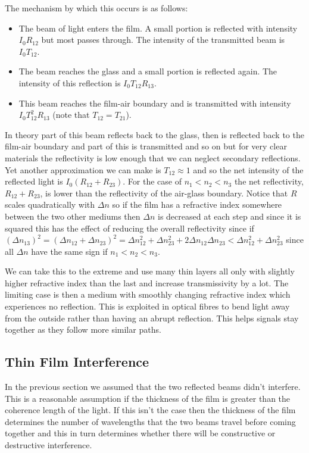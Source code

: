     The mechanism by which this occurs is as follows:
    \begin{itemize}
        \item The beam of light enters the film.
        A small portion is reflected with intensity \(I_0R_{12}\) but most passes through. The intensity of the transmitted beam is \(I_0T_{12}\).
        \item The beam reaches the glass and a small portion is reflected again.
        The intensity of this reflection is \(I_{0}T_{12}R_{13}\).
        \item This beam reaches the film-air boundary and is transmitted with intensity \(I_{0}T_{12}^2R_{13}\) (note that \(T_{12} = T_{21}\)).
    \end{itemize}
    In theory part of this beam reflects back to the glass, then is reflected back to the film-air boundary and part of this is transmitted and so on but for very clear materials the reflectivity is low enough that we can neglect secondary reflections.
    Yet another approximation we can make is \(T_{12} \approx 1\) and so the net intensity of the reflected light is \(I_0(R_{12} + R_{23})\).
    For the case of \(n_1 < n_2 < n_3\) the net reflectivity, \(R_{12} + R_{23}\), is lower than the reflectivity of the air-glass boundary.
    Notice that \(R\) scales quadratically with \(\Delta n\) so if the film has a refractive index somewhere between the two other mediums then \(\Delta n\) is decreased at each step and since it is squared this has the effect of reducing the overall reflectivity since if \((\Delta n_{13})^2 = (\Delta n_{12} + \Delta n_{23})^2 = \Delta n_{12}^2 + \Delta n_{23}^2 + 2\Delta n_{12}\Delta n_{23} < \Delta n_{12}^2 + \Delta n_{23}^2\) since all \(\Delta n\) have the same sign if \(n_1 < n_2 < n_3\).
    
    We can take this to the extreme and use many thin layers all only with slightly higher refractive index than the last and increase transmissivity by a lot.
    The limiting case is then a medium with smoothly changing refractive index which experiences no reflection.
    This is exploited in optical fibres to bend light away from the outside rather than having an abrupt reflection.
    This helps signals stay together as they follow more similar paths.
    
    \subsection{Thin Film Interference}
    In the previous section we assumed that the two reflected beams didn't interfere.
    This is a reasonable assumption if the thickness of the film is greater than the coherence length of the light.
    If this isn't the case then the thickness of the film determines the number of wavelengths that the two beams travel before coming together and this in turn determines whether there will be constructive or destructive interference.
    
